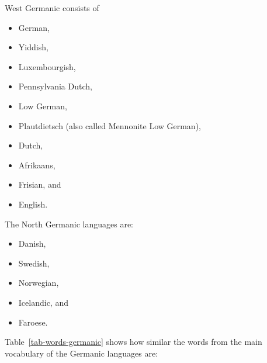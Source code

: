 West Germanic consists of 
\begin{itemize}
\item German, 
\item Yiddish, 
\item Luxembourgish, 
\item Pennsylvania Dutch, 
\item Low German, %
\item Plautdietsch (also called Mennonite Low German), %
\item Dutch, 
\item Afrikaans, 
\item Frisian, and 
\item English.
\end{itemize}
The North Germanic languages are:
\begin{itemize}
\item Danish,
\item Swedish,
\item Norwegian,
\item Icelandic, and 
\item Faroese.
\end{itemize}


Table~\vref{tab-words-germanic} shows how similar the words from the main vocabulary of the Germanic
languages are:
\begin{table}
\caption{\label{tab-words-germanic}Words from the main vocabulary of some Germanic languages}
\end{table}

